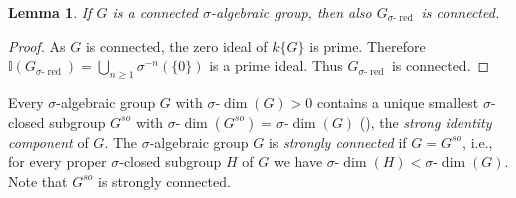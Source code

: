 \documentclass[oneside,reqno]{amsart}
\newtheorem{lemma}[theo]{Lemma}
\theoremstyle{definition}
\newcommand{\sdim}{\sigma\text{-}\dim}
\newcommand{\s}{\sigma}
\newcommand{\I}{\mathbb{I}}
\newcommand{\sred}{{\sigma\text{-}\operatorname{red}}}
\begin{document}
\begin{lemma} \label{lemma: Gsred is connnected}
	If $G$ is a connected $\s$-algebraic group, then also $G_\sred$ is connected.
\end{lemma} 
\begin{proof}
	As $G$ is connected, the zero ideal of $k\{G\}$ is prime. Therefore $\I(G_\sred)=\bigcup_{n\geq 1}\s^{-n}(\{0\})$ is a prime ideal. Thus $G_\sred$ is connected.
\end{proof}



Every $\s$-algebraic group $G$ with $\sdim(G)>0$ contains a unique smallest $\s$-closed subgroup $G^{so}$ with $\sdim(G^{so})=\sdim(G)$ (\cite[Lemma 6.18]{Wibmer:almostsimple}), the \emph{strong identity component} of $G$. The $\s$-algebraic group $G$ is \emph{strongly connected} if $G=G^{so}$, i.e., for every proper $\s$-closed subgroup $H$ of $G$ we have $\sdim(H)<\sdim(G)$. %
Note that $G^{so}$ is strongly connected.
\end{document}
